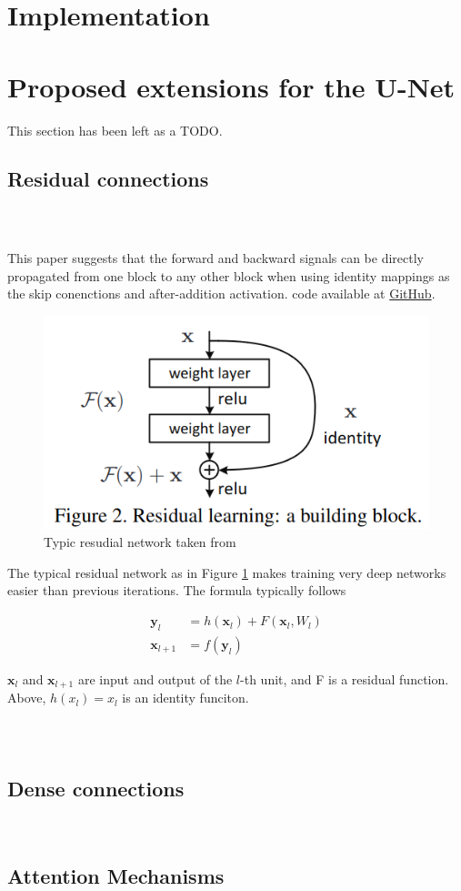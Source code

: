 \documentclass[11pt]{article}
\begin{document}
\section{Implementation}

\section{Proposed extensions for the U-Net}

This section has been left as a TODO.

\subsection{Residual connections}

\subsubsection{~\cite{identity-mappings-drns}}

This paper suggests that the forward and backward signals can be directly propagated from one block to any other block when using identity mappings as the skip conenctions and after-addition activation. code available at \href{https://github.com/KaimingHe/resnet-1k-layers/blob/master/resnet-pre-act.lua}{GitHub}.

\begin{figure}[H]
    \centering
    \includegraphics[width=0.4\linewidth]{images/residualArchitecture.png}
    \caption{Typic resudial network taken from~\cite{drn-for-image-recognition}}
    \label{residual-architecture}
\end{figure}

The typical residual network as in Figure \ref{residual-architecture} makes training very deep networks easier than previous iterations. The formula typically follows 

\begin{align}
    \textbf{y}_l &= h(\textbf{x}_l) + F(\textbf{x}_l, W_l) \\
    \textbf{x}_{l+1} &= f(\textbf{y}_l)
\end{align}

$\textbf{x}_l$ and $\textbf{x}_{l+1}$ are input and output of the $l$-th unit, and F is a residual function. Above, 
$h(x_l)=x_l$ is an identity funciton. 

\subsubsection{~\cite{v-net}}

\subsection{Dense connections}

~\cite{tiramisu-densenet}

\subsection{Attention Mechanisms}

~\cite{attention-u-net}

\printbibliography
\end{document}
